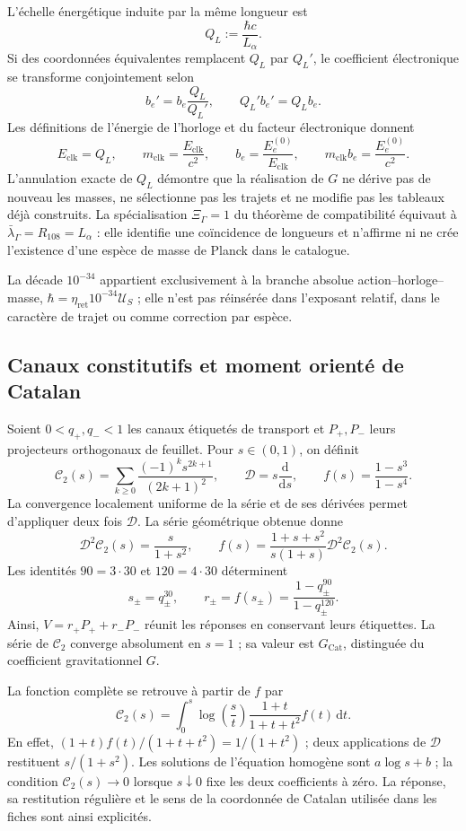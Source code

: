 L'échelle énergétique induite par la même longueur est
\[
 Q_L:=\frac{\hbar c}{L_{\alpha}}.
 \tag{A.4}\label{eq:vi-cat-escala-q}
\]
Si des coordonnées équivalentes remplacent \(Q_L\) par \(Q_L'\), le coefficient
électronique se transforme conjointement selon
\[
 b_e'=b_e\frac{Q_L}{Q_L'},\qquad Q_L'b_e'=Q_Lb_e .
 \tag{A.5}\label{eq:vi-cat-cotransformacion-be}
\]
Les définitions de l'énergie de l'horloge et du facteur électronique donnent
\[
 E_{\mathrm{clk}}=Q_L,\qquad
 m_{\mathrm{clk}}=\frac{E_{\mathrm{clk}}}{c^2},\qquad
 b_e=\frac{E_e^{(0)}}{E_{\mathrm{clk}}},\qquad
 m_{\mathrm{clk}}b_e=\frac{E_e^{(0)}}{c^2}.
\]
L'annulation exacte de \(Q_L\) démontre que la réalisation de \(G\) ne dérive
pas de nouveau les masses, ne sélectionne pas les trajets et ne modifie pas
les tableaux déjà construits. La spécialisation \(\Xi_\Gamma=1\) du théorème
de compatibilité équivaut à \(\bar\lambda_\Gamma=R_{108}=L_{\alpha}\) : elle
identifie une coïncidence de longueurs et n'affirme ni ne crée l'existence
d'une espèce de masse de Planck dans le catalogue.

La décade \(10^{-34}\) appartient exclusivement à la branche absolue
action--horloge--masse, \(\hbar=\eta_{\mathrm{ret}}10^{-34}\mathcal U_S\) ;
elle n'est pas réinsérée dans l'exposant relatif, dans le caractère de trajet
ou comme correction par espèce.

\subsection{Canaux constitutifs et moment orienté de Catalan}
\label{sec:vi-catalogo-propietario-constitutivo}

Soient \(0<q_+,q_-<1\) les canaux étiquetés de transport et \(P_+,P_-\)
leurs projecteurs orthogonaux de feuillet. Pour \(s\in(0,1)\), on définit
\[
 \mathcal C_2(s)=\sum_{k\geq0}
 \frac{(-1)^k s^{2k+1}}{(2k+1)^2},\qquad
 \mathcal D=s\frac{\mathrm d}{\mathrm ds},\qquad
 f(s)=\frac{1-s^3}{1-s^4}.
 \tag{A.6}\label{eq:vi-cat-constitutivas}
\]
La convergence localement uniforme de la série et de ses dérivées permet
d'appliquer deux fois \(\mathcal D\). La série géométrique obtenue donne
\[
 \mathcal D^2\mathcal C_2(s)=\frac{s}{1+s^2},\qquad
 f(s)=\frac{1+s+s^2}{s(1+s)}\mathcal D^2\mathcal C_2(s).
\]
Les identités \(90=3\cdot30\) et \(120=4\cdot30\) déterminent
\[
 s_{\pm}=q_{\pm}^{30},\qquad
 r_{\pm}=f(s_{\pm})
 =\frac{1-q_{\pm}^{90}}{1-q_{\pm}^{120}}.
\]
Ainsi, \(V=r_+P_++r_-P_-\) réunit les réponses en conservant leurs étiquettes.
La série de \(\mathcal C_2\) converge absolument en \(s=1\) ; sa valeur est
\(G_{\mathrm{Cat}}\), distinguée du coefficient gravitationnel \(G\).

La fonction complète se retrouve à partir de \(f\) par
\[
 \mathcal C_2(s)=\int_0^s\log\!\left(\frac{s}{t}\right)
 \frac{1+t}{1+t+t^2}f(t)\,\mathrm dt.
\]
En effet, \((1+t)f(t)/(1+t+t^2)=1/(1+t^2)\) ; deux applications de
\(\mathcal D\) restituent \(s/(1+s^2)\). Les solutions de l'équation homogène
sont \(a\log s+b\) ; la condition \(\mathcal C_2(s)\to0\) lorsque
\(s\downarrow0\) fixe les deux coefficients à zéro. La réponse, sa restitution
régulière et le sens de la coordonnée de Catalan utilisée dans les fiches
sont ainsi explicités.
